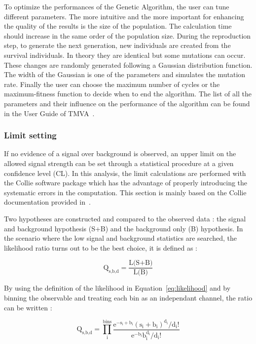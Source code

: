 \documentclass[main.tex]{subfiles}
\begin{document}
\NI To optimize the performances of the Genetic Algorithm, the user can tune different parameters. The more intuitive and the more important for enhancing the quality of the results is the size of the population. The calculation time should increase in the same order of the population size. During the reproduction step, to generate the next generation, new individuals are created from the survival individuals. In theory they are identical but some mutations can occur. These changes are randomly generated following a Gaussian distribution function. The width of the Gaussian is one of the parameters and simulates the mutation rate. Finally the user can choose the maximum number of cycles or the maximum-fitness function to decide when to end the algorithm. The list of all the parameters and their influence on the performance of the algorithm can be found in the User Guide of TMVA~\cite{TMVA}.


\subsubsection{Limit setting}


\NI If no evidence of a signal over background is observed, an upper limit on the allowed signal strength can be set through a statistical procedure at a given confidence level (CL). In this analysis, the limit calculations are performed with the Collie software package which has the advantage of properly introducing the systematic errors in the computation. This section is mainly based on the Collie documentation provided in~\cite{NLLR}.


\bigskip


\NI Two hypotheses are constructed and compared to the observed data : the signal and background hypothesis (S+B) and the background only (B) hypothesis. In the scenario where the low signal and background statistics are searched, the likelihood ratio turns out to be the best choice, it is defined as : 


\begin{equation}
\text{Q}_{\text{s,b,d}} = \frac{\text{L(S+B)}}{\text{L(B)}}
\end{equation}


\NI By using the definition of the likelihood in Equation~\ref{eq:likelihood} and by binning the observable and treating each bin as an independant channel, the ratio can be written : 


\bigskip


\begin{equation}
\text{Q}_{\text{s,b,d}} = \prod^{\text{bins}}_\text{i} \frac{\text{e}^{-\text{s}_\text{i} + \text{b}_\text{i}} (\text{s}_\text{i} + \text{b}_\text{i})^{\text{d}_\text{i}} / \text{d}_\text{i} \text{!} }{\text{e}^{-\text{b}_\text{i}} \text{b}_\text{i}^{\text{d}_\text{i}} / \text{d}_\text{i} \text{!}} 
\end{equation}
\end{document}
